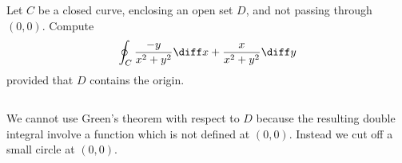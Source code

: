 \begin{frame}
\begin{example}
\begin{columns}

Let $C$ be a closed curve, enclosing an open set $D$, and not passing through $(0,0)$. Compute 
\[
\oint_C \frac{-y}{x^2+y^2}\diff x + \frac{x}{x^2+y^2}\diff y
\]
provided that $D$ contains the origin.
\end{columns}
We cannot use Green's theorem with respect to $D$ because the resulting double integral involve a function which is not defined at $(0,0)$. Instead we cut off a small circle at $(0,0)$.
\end{example}
\end{frame}